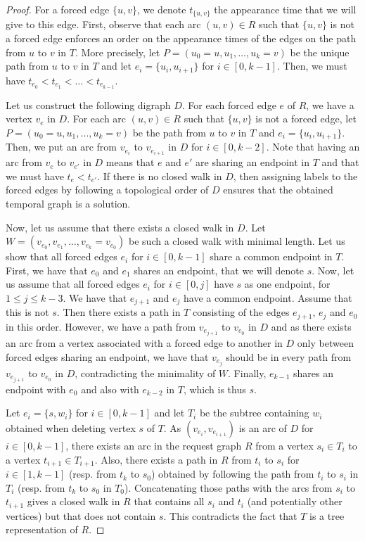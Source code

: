 \documentclass[11pt]{article}%
\begin{document}
\begin{proof}
For a forced edge $\{u,v\}$, we denote $t_{\{u,v\}}$ the appearance time that we will give to this edge. First, observe that each arc $(u,v)\in R$ such that $\{u,v\}$ is not a forced edge enforces an order on the appearance times of the edges on the path from $u$ to $v$ in $T$. More precisely, let $P=(u_0=u,u_1,\dots,u_k=v)$ be the unique path from $u$ to $v$ in $T$ and let $e_i=\{u_i,u_{i+1}\}$ for $i\in [0,k-1]$. Then, we must have $t_{e_0}<t_{e_1}<\dots<t_{e_{k-1}}$. 

Let us construct the following digraph $D$. For each forced edge $e$ of $R$, we have a vertex $v_e$ in $D$. For each arc $(u,v)\in R$ such that $\{u,v\}$ is not a forced edge, let $P=(u_0=u,u_1,\dots,u_k=v)$ be the path from $u$ to $v$ in $T$ and $e_i=\{u_i,u_{i+1}\}$. Then, we put an arc from $v_{e_i}$ to $v_{e_{i+1}}$ in $D$ for $i\in [0,k-2]$. Note that having an arc from $v_{e}$ to $v_{e'}$ in $D$ means that $e$ and $e'$ are sharing an endpoint in $T$ and that we must have $t_e<t_{e'}$. If there is no closed walk in $D$, then assigning labels to the forced edges by following a topological order of $D$ ensures that the obtained temporal graph is a solution. 

Now, let us assume that there exists a closed walk in $D$. Let $W=(v_{e_0},v_{e_1},\dots,v_{e_k}=v_{e_0})$ be such a closed walk with minimal length. %
Let us show that all forced edges $e_i$ for $i\in [0,k-1]$ share a common endpoint in $T$. First, we have that $e_0$ and $e_1$ shares an endpoint, that we will denote $s$. Now, let us assume that all forced edges $e_i$ for $i\in [0,j]$ have $s$ as one endpoint, for $1\leq j \leq k-3$. We have that $e_{j+1}$ and $e_j$ have a common endpoint. Assume that this is not $s$. Then there exists a path in $T$ consisting of the edges $e_{j+1}$, $e_j$ and $e_{0}$ in this order. However, we have a path from $v_{e_{j+1}}$ to $v_{e_0}$ in $D$ and as there exists an arc from a vertex associated with a forced edge to another in $D$ only between forced edges sharing an endpoint, we have that $v_{e_j}$ should be in every path from  $v_{e_{j+1}}$ to $v_{e_0}$ in $D$, contradicting the minimality of $W$. Finally, $e_{k-1}$ shares an endpoint with $e_0$ and also with $e_{k-2}$ in $T$, which is thus $s$. 

Let $e_i=\{s,w_i\}$ for $i\in [0,k-1]$ and let $T_i$ be the subtree containing $w_i$ obtained when deleting vertex $s$ of $T$. As $(v_{e_i},v_{e_{i+1}})$ is an arc of $D$ for $i\in [0,k-1]$, there exists an arc in the request graph $R$ from a vertex $s_i\in T_i$ to a vertex $t_{i+1}\in T_{i+1}$. Also, there exists a path in $R$ from $t_i$ to $s_i$ for $i\in [1,k-1]$ (resp. from $t_k$ to $s_0$) obtained by following the path from $t_i$ to $s_i$ in $T_i$ (resp. from $t_k$ to $s_0$ in $T_0$). Concatenating those paths with the arcs from $s_i$ to $t_{i+1}$ gives a closed walk in $R$ that contains all $s_i$ and $t_i$ (and potentially other vertices) but that does not contain $s$. This contradicts the fact that $T$ is a tree representation of $R$. 
\end{proof}
\end{document}
